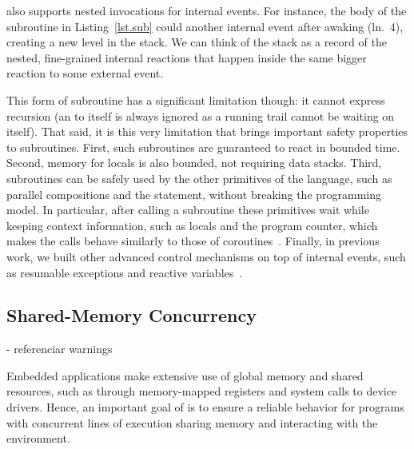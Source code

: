\CEU also supports nested  invocations for internal events.
%
For instance, the body of the subroutine  in Listing~\ref{lst.sub}
could  another internal event after awaking (ln.~4), creating a
new level in the stack.
%
We can think of the stack as a record of the nested, fine-grained internal
reactions that happen inside the same bigger reaction to some external
event.

This form of subroutine has a significant limitation though: it cannot
express recursion (an  to itself is always ignored as a running
trail cannot be waiting on itself).
%
That said, it is this very limitation that brings important safety
properties to subroutines.
%
First, such subroutines are guaranteed to react in bounded time.
%
Second, memory for locals is also bounded, not requiring data stacks.
%
Third, \CEU subroutines can be safely used by the other primitives of the
language, such as parallel compositions and the  statement,
without breaking the programming model.
%
In particular, after calling a subroutine these primitives wait while
keeping context information, such as locals and the program counter, which
makes the calls behave similarly to those of
coroutines~\cite{lua.coroutines}.
%
Finally, in previous work, we built other advanced control mechanisms on top
of internal events, such as resumable exceptions and reactive
variables~\cite{ceu.rem13}.
%
%

\subsection{Shared-Memory Concurrency}
    - referenciar warnings

Embedded applications make extensive use of global memory and shared resources,
such as through memory-mapped registers and system calls to device drivers.
Hence, an important goal of \CEU is to ensure a reliable behavior for programs
with concurrent lines of execution sharing memory and interacting with the
environment.


